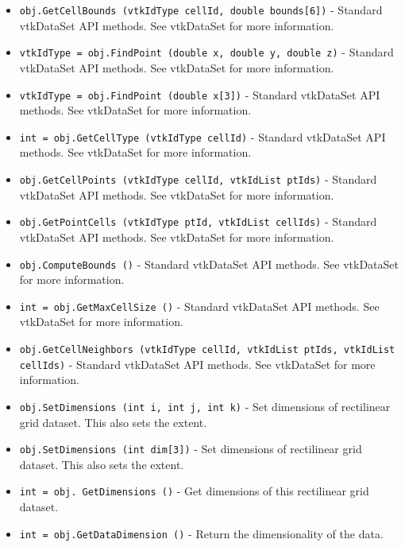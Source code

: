 \begin{itemize}
\item  \verb|obj.GetCellBounds (vtkIdType cellId, double bounds[6])| -  Standard vtkDataSet API methods. See vtkDataSet for more information.

\item  \verb|vtkIdType = obj.FindPoint (double x, double y, double z)| -  Standard vtkDataSet API methods. See vtkDataSet for more information.

\item  \verb|vtkIdType = obj.FindPoint (double x[3])| -  Standard vtkDataSet API methods. See vtkDataSet for more information.

\item  \verb|int = obj.GetCellType (vtkIdType cellId)| -  Standard vtkDataSet API methods. See vtkDataSet for more information.

\item  \verb|obj.GetCellPoints (vtkIdType cellId, vtkIdList ptIds)| -  Standard vtkDataSet API methods. See vtkDataSet for more information.

\item  \verb|obj.GetPointCells (vtkIdType ptId, vtkIdList cellIds)| -  Standard vtkDataSet API methods. See vtkDataSet for more information.

\item  \verb|obj.ComputeBounds ()| -  Standard vtkDataSet API methods. See vtkDataSet for more information.

\item  \verb|int = obj.GetMaxCellSize ()| -  Standard vtkDataSet API methods. See vtkDataSet for more information.

\item  \verb|obj.GetCellNeighbors (vtkIdType cellId, vtkIdList ptIds, vtkIdList cellIds)| -  Standard vtkDataSet API methods. See vtkDataSet for more information.

\item  \verb|obj.SetDimensions (int i, int j, int k)| -  Set dimensions of rectilinear grid dataset.
 This also sets the extent.

\item  \verb|obj.SetDimensions (int dim[3])| -  Set dimensions of rectilinear grid dataset.
 This also sets the extent.

\item  \verb|int = obj. GetDimensions ()| -  Get dimensions of this rectilinear grid dataset.

\item  \verb|int = obj.GetDataDimension ()| -  Return the dimensionality of the data.


\end{itemize}
